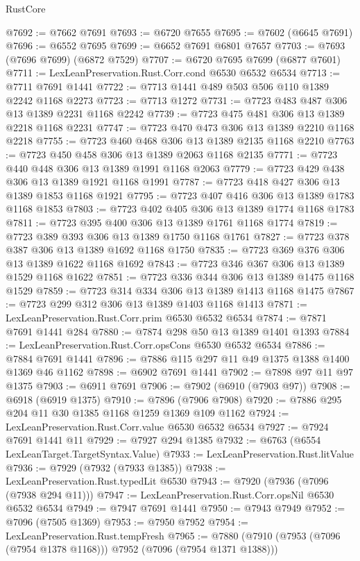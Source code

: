 \begin{lexlean}{RustCore}
\begin{coremodule}
@7692 := @7662 @7691
@7693 := @6720 @7655
@7695 := @7602 (@6645 @7691)
@7696 := @6552 @7695
@7699 := @6652 @7691 @6801 @7657
@7703 := @7693 (@7696 @7699) (@6872 @7529)
@7707 := @6720 @7695 @7699 (@6877 @7601)
@7711 := LexLeanPreservation.Rust.Corr.cond @6530 @6532 @6534
@7713 := @7711 @7691 @1441
@7722 := @7713 @1441 @489 @503 @506 @110 @1389 @2242 @1168 @2273
@7723 := @7713 @1272
@7731 := @7723 @483 @487 @306 @13 @1389 @2231 @1168 @2242
@7739 := @7723 @475 @481 @306 @13 @1389 @2218 @1168 @2231
@7747 := @7723 @470 @473 @306 @13 @1389 @2210 @1168 @2218
@7755 := @7723 @460 @468 @306 @13 @1389 @2135 @1168 @2210
@7763 := @7723 @450 @458 @306 @13 @1389 @2063 @1168 @2135
@7771 := @7723 @440 @448 @306 @13 @1389 @1991 @1168 @2063
@7779 := @7723 @429 @438 @306 @13 @1389 @1921 @1168 @1991
@7787 := @7723 @418 @427 @306 @13 @1389 @1853 @1168 @1921
@7795 := @7723 @407 @416 @306 @13 @1389 @1783 @1168 @1853
@7803 := @7723 @402 @405 @306 @13 @1389 @1774 @1168 @1783
@7811 := @7723 @395 @400 @306 @13 @1389 @1761 @1168 @1774
@7819 := @7723 @389 @393 @306 @13 @1389 @1750 @1168 @1761
@7827 := @7723 @378 @387 @306 @13 @1389 @1692 @1168 @1750
@7835 := @7723 @369 @376 @306 @13 @1389 @1622 @1168 @1692
@7843 := @7723 @346 @367 @306 @13 @1389 @1529 @1168 @1622
@7851 := @7723 @336 @344 @306 @13 @1389 @1475 @1168 @1529
@7859 := @7723 @314 @334 @306 @13 @1389 @1413 @1168 @1475
@7867 := @7723 @299 @312 @306 @13 @1389 @1403 @1168 @1413
@7871 := LexLeanPreservation.Rust.Corr.prim @6530 @6532 @6534
@7874 := @7871 @7691 @1441 @284
@7880 := @7874 @298 @50 @13 @1389 @1401 @1393
@7884 := LexLeanPreservation.Rust.Corr.opsCons @6530 @6532 @6534
@7886 := @7884 @7691 @1441
@7896 := @7886 @115 @297 @11 @49 @1375 @1388 @1400 @1369 @46 @1162
@7898 := @6902 @7691 @1441
@7902 := @7898 @97 @11 @97 @1375
@7903 := @6911 @7691
@7906 := @7902 (@6910 (@7903 @97))
@7908 := @6918 (@6919 @1375)
@7910 := @7896 (@7906 @7908)
@7920 := @7886 @295 @204 @11 @30 @1385 @1168 @1259 @1369 @109 @1162
@7924 := LexLeanPreservation.Rust.Corr.value @6530 @6532 @6534
@7927 := @7924 @7691 @1441 @11
@7929 := @7927 @294 @1385
@7932 := @6763 (@6554 LexLeanTarget.TargetSyntax.Value)
@7933 := LexLeanPreservation.Rust.litValue
@7936 := @7929 (@7932 (@7933 @1385))
@7938 := LexLeanPreservation.Rust.typedLit @6530
@7943 := @7920 (@7936 (@7096 (@7938 @294 @11)))
@7947 := LexLeanPreservation.Rust.Corr.opsNil @6530 @6532 @6534
@7949 := @7947 @7691 @1441
@7950 := @7943 @7949
@7952 := @7096 (@7505 @1369)
@7953 := @7950 @7952
@7954 := LexLeanPreservation.Rust.tempFresh
@7965 := @7880 (@7910 (@7953 (@7096 (@7954 @1378 @1168))) @7952 (@7096 (@7954 @1371 @1388)))

\end{coremodule}
\end{lexlean}
